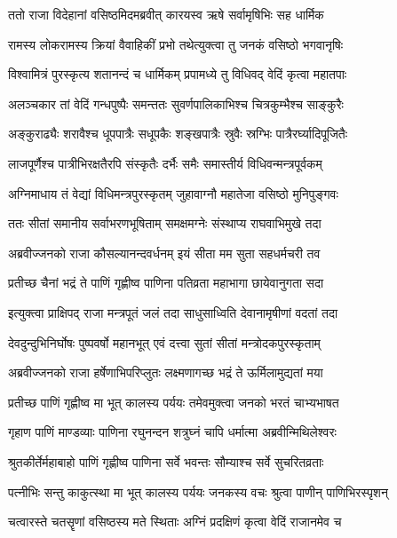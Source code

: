 \twolineshloka
{ततो राजा विदेहानां वसिष्ठमिदमब्रवीत्}
{कारयस्व ऋषे सर्वामृषिभिः सह धार्मिक} %

\twolineshloka
{रामस्य लोकरामस्य क्रियां वैवाहिकीं प्रभो}
{तथेत्युक्त्वा तु जनकं वसिष्ठो भगवानृषिः} %

\twolineshloka
{विश्वामित्रं पुरस्कृत्य शतानन्दं च धार्मिकम्}
{प्रपामध्ये तु विधिवद् वेदिं कृत्वा महातपाः} %

\twolineshloka
{अलञ्चकार तां वेदिं गन्धपुष्पैः समन्ततः}
{सुवर्णपालिकाभिश्च चित्रकुम्भैश्च साङ्कुरैः} %

\twolineshloka
{अङ्कुराढ्यैः शरावैश्च धूपपात्रैः सधूपकैः}
{शङ्खपात्रैः स्रुवैः स्रग्भिः पात्रैरर्घ्यादिपूजितैः} %

\twolineshloka
{लाजपूर्णैश्च पात्रीभिरक्षतैरपि संस्कृतैः}
{दर्भैः समैः समास्तीर्य विधिवन्मन्त्रपूर्वकम्} %

\twolineshloka
{अग्निमाधाय तं वेद्यां विधिमन्त्रपुरस्कृतम्}
{जुहावाग्नौ महातेजा वसिष्ठो मुनिपुङ्गवः} %

\twolineshloka
{ततः सीतां समानीय सर्वाभरणभूषिताम्}
{समक्षमग्नेः संस्थाप्य राघवाभिमुखे तदा} %

\twolineshloka
{अब्रवीज्जनको राजा कौसल्यानन्दवर्धनम्}
{इयं सीता मम सुता सहधर्मचरी तव} %

\twolineshloka
{प्रतीच्छ चैनां भद्रं ते पाणिं गृह्णीष्व पाणिना}
{पतिव्रता महाभागा छायेवानुगता सदा} %

\twolineshloka
{इत्युक्त्वा प्राक्षिपद् राजा मन्त्रपूतं जलं तदा}
{साधुसाध्विति देवानामृषीणां वदतां तदा} %

\twolineshloka
{देवदुन्दुभिनिर्घोषः पुष्पवर्षो महानभूत्}
{एवं दत्त्वा सुतां सीतां मन्त्रोदकपुरस्कृताम्} %

\twolineshloka
{अब्रवीज्जनको राजा हर्षेणाभिपरिप्लुतः}
{लक्ष्मणागच्छ भद्रं ते ऊर्मिलामुद्यतां मया} %

\twolineshloka
{प्रतीच्छ पाणिं गृह्णीष्व मा भूत् कालस्य पर्ययः}
{तमेवमुक्त्वा जनको भरतं चाभ्यभाषत} %

\twolineshloka
{गृहाण पाणिं माण्डव्याः पाणिना रघुनन्दन}
{शत्रुघ्नं चापि धर्मात्मा अब्रवीन्मिथिलेश्वरः} %

\twolineshloka
{श्रुतकीर्तेर्महाबाहो पाणिं गृह्णीष्व पाणिना}
{सर्वे भवन्तः सौम्याश्च सर्वे सुचरितव्रताः} %

\twolineshloka
{पत्नीभिः सन्तु काकुत्स्था मा भूत् कालस्य पर्ययः}
{जनकस्य वचः श्रुत्वा पाणीन् पाणिभिरस्पृशन्} %

\twolineshloka
{चत्वारस्ते चतसॄणां वसिष्ठस्य मते स्थिताः}
{अग्निं प्रदक्षिणं कृत्वा वेदिं राजानमेव च} %

